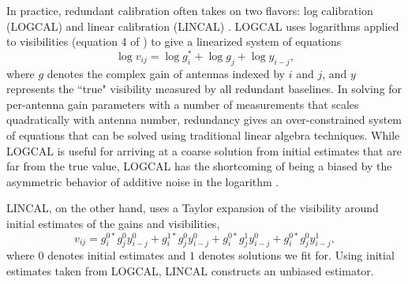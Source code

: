 \documentclass[twocolumn,numberedappendix]{emulateapj} \shorttitle{PSA64}
\begin{document}

In practice, redundant calibration often takes on two flavors: log calibration (LOGCAL) and
linear calibration (LINCAL) \citep{liu_et_al2010,zheng_et_al2014}. LOGCAL uses 
logarithms applied to visibilities (equation 4 of
\citealt{zheng_et_al2014}) to give a linearized system of equations
\begin{equation}\label{eqn:logcal}
    \log{v_{ij}} = \log{g_{i}^{*}} + \log{g_{j}} + \log{y_{i-j}},
\end{equation}
where $g$ denotes the 
complex gain of antennas indexed by $i$ and $j$, and $y$ represents the ``true" visibility 
measured by all redundant baselines.  In solving for per-antenna gain parameters with
a number of measurements that scales quadratically with antenna number, redundancy gives 
an over-constrained
system of equations that can be solved
using traditional linear algebra techniques.
While LOGCAL is useful for arriving at a coarse solution from initial estimates that are far
from the true value, LOGCAL has the shortcoming of being a biased by the asymmetric behavior
of additive noise in the logarithm \citep{liu_et_al2010}.

LINCAL, on the other hand, uses a Taylor expansion of the visibility around initial
estimates of the gains and visibilities, 
\begin{equation}\label{eqn:lincal}
v_{ij} = g_{i}^{0*}g_{j}^{0}y_{i-j}^{0} + g_{i}^{1*}g_{j}^{0}y_{i-j}^{0} +
         g_{i}^{0*}g_{j}^{1}y_{i-j}^{0}+g_{i}^{0*}g_{j}^{0}y_{i-j}^{1},
\end{equation}
where $0$ denotes initial estimates and $1$ denotes 
solutions we fit for.  Using initial
estimates taken from LOGCAL, LINCAL constructs an unbiased estimator.
\end{document}

